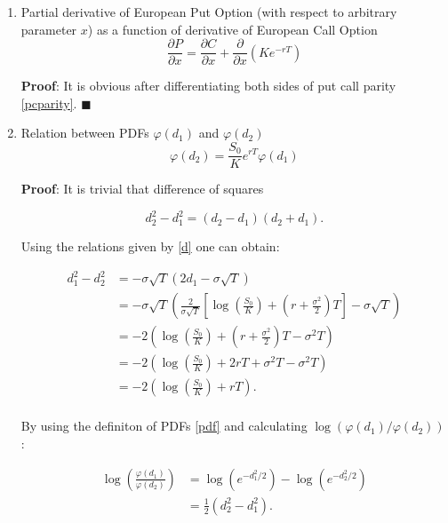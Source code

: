 \documentclass[12pt]{article}
\begin{document}
\begin{enumerate}[leftmargin=\labelsep]
\begin{enumerate}
    \item Partial derivative of European Put Option (with respect to arbitrary parameter $x$) as a function of derivative of European Call Option
    \begin{equation}\label{identity11}
        \frac{\partial P}{\partial x} = \frac{\partial C}{\partial x} + \frac{\partial }{\partial x} \left( K e^{-rT} \right)
    \end{equation}

    \textbf{Proof}: It is obvious after differentiating both sides of put call parity \eqref{pcparity}. $\blacksquare$

    \item Relation between PDFs $\varphi(d_1)$ and $\varphi(d_2)$
    \begin{equation}\label{identity1}
        \varphi(d_2) =\frac{S_0}{K} e^{rT} \varphi(d_1)
    \end{equation}

    \textbf{Proof}: It is trivial that difference of squares
    
    \begin{equation}
        d_2^2 - d_1^2 = (d_2-d_1)(d_2 + d_1).
    \end{equation}
    
    Using the relations given by \eqref{d} one can obtain:

    \begin{equation}
    \begin{split}\label{identity0}
        d_1^2 - d_2^2 &=  - \sigma \sqrt{T} \left( 2 d_1 - \sigma \sqrt{T} \right) \\
        &=  - \sigma \sqrt{T} \left( \frac{2}{\sigma\sqrt{T}}\left[\log\left(\frac{S_0}{K}\right) + \left(r + \frac{\sigma^2}{2}\right)T\right]  - \sigma \sqrt{T} \right)\\
        &=  -2 \left(\log\left(\frac{S_0}{K}\right) + \left(r + \frac{\sigma^2}{2}\right)T  - \sigma^2 T \right) \\
        &=  -2 \left( \log\left(\frac{S_0}{K}\right) + 2rT + \sigma^2 T  - \sigma^2 T \right)\\
        &=  -2 \left( \log\left(\frac{S_0}{K}\right) + rT \right).\\
    \end{split}
    \end{equation}

    By using the definiton of PDFs \eqref{pdf} and calculating $\log(\varphi(d_1)/ \varphi(d_2))$:

    \begin{equation}
    \begin{split}\label{identity2}
        \log \left( \frac{\varphi(d_1)}{\varphi(d_2)} \right)
        & = \log \left( e^{-d_1^2/2} \right) - \log \left( e^{-d_2^2/2} \right) \\
        & = \frac{1}{2} \left( d_2^2 - d_1^2 \right).
    \end{split}
    \end{equation}


\end{enumerate}
\end{enumerate}
\end{document}
